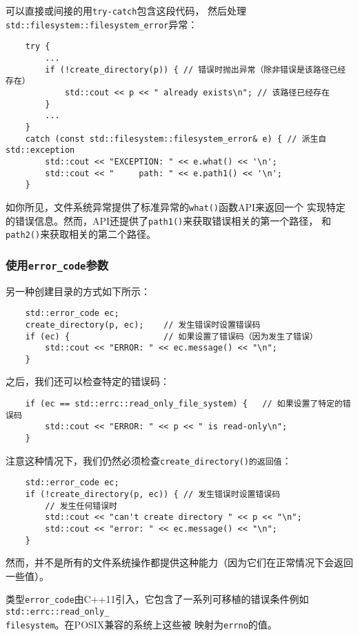 可以直接或间接的用\texttt{try-catch}包含这段代码，
然后处理\texttt{std::filesystem::filesystem\_error}异常：
\begin{lstlisting}
    try {
        ...
        if (!create_directory(p)) { // 错误时抛出异常（除非错误是该路径已经存在）
            std::cout << p << " already exists\n"; // 该路径已经存在
        }
        ...
    }
    catch (const std::filesystem::filesystem_error& e) { // 派生自std::exception
        std::cout << "EXCEPTION: " << e.what() << '\n';
        std::cout << "     path: " << e.path1() << '\n';
    }
\end{lstlisting}
如你所见，文件系统异常提供了标准异常的\texttt{what()}函数API来返回一个
实现特定的错误信息。然而，API还提供了\texttt{path1()}来获取错误相关的第一个路径，
和\texttt{path2()}来获取相关的第二个路径。

\subsubsection{使用\texttt{error\_code}参数}
另一种创建目录的方式如下所示：
\begin{lstlisting}
    std::error_code ec;
    create_directory(p, ec);    // 发生错误时设置错误码
    if (ec) {                   // 如果设置了错误码（因为发生了错误）
        std::cout << "ERROR: " << ec.message() << "\n";
    }
\end{lstlisting}
之后，我们还可以检查特定的错误码：
\begin{lstlisting}
    if (ec == std::errc::read_only_file_system) {   // 如果设置了特定的错误码
        std::cout << "ERROR: " << p << " is read-only\n";
    }
\end{lstlisting}
注意这种情况下，我们仍然必须检查\texttt{create\_directory()的返回值}：
\begin{lstlisting}
    std::error_code ec;
    if (!create_directory(p, ec)) { // 发生错误时设置错误码
        // 发生任何错误时
        std::cout << "can't create directory " << p << "\n";
        std::cout << "error: " << ec.message() << "\n";
    }
\end{lstlisting}
然而，并不是所有的文件系统操作都提供这种能力（因为它们在正常情况下会返回一些值）。

类型\texttt{error\_code}由C++11引入，它包含了一系列可移植的错误条件例如
\texttt{std::errc::read\_only\_\\
filesystem}。在POSIX兼容的系统上这些被
映射为\texttt{errno}的值。

